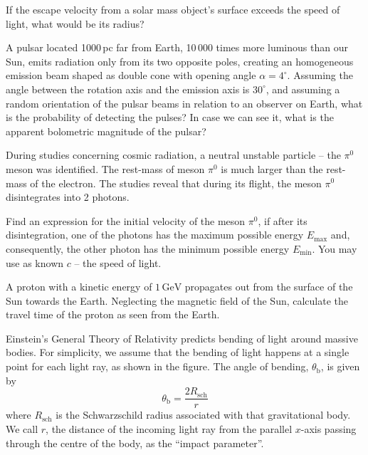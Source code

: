 If the escape velocity from a solar mass object's surface exceeds the speed of
light, what would be its radius?

A pulsar located 1000\,pc far from Earth, 10\,000 times more luminous than our
Sun, emits radiation only from its two opposite poles, creating an homogeneous
emission beam shaped as double cone with opening angle $\alpha = 4^\circ$.
Assuming the angle between the rotation axis and the emission axis is
$30^\circ$, and assuming a random orientation of the pulsar beams in relation
to an observer on Earth, what is the probability of detecting the pulses? In
case we can see it, what is the apparent bolometric magnitude of the pulsar?

During studies concerning cosmic radiation, a neutral unstable particle -- the
$\pi^0$ meson was identified. The rest-mass of meson $\pi^0$ is much larger
than the rest-mass of the electron. The studies reveal that during its flight,
the meson $\pi^0$ disintegrates into 2 photons.

Find an expression for the initial velocity of the meson $\pi^0$, if after its
disintegration, one of the photons has the maximum possible energy
$E_{\mathrm{max}}$ and, consequently, the other photon has the minimum
possible energy $E_{\mathrm{min}}$. You may use as known $c$ -- the speed of
light.

A proton with a kinetic energy of $1\,\mathrm{GeV}$ propagates out from the
surface of the Sun towards the Earth. Neglecting the magnetic field of the
Sun, calculate the travel time of the proton as seen from the Earth.

Einstein's General Theory of Relativity predicts bending of light around
massive bodies. For simplicity, we assume that the bending of light happens at
a single point for each light ray, as shown in the figure. The angle of
bending, $\theta_{\mathrm{b}}$, is given by
\[ \theta_{\mathrm{b}} = \frac{2R_{\mathrm{sch}}}{r} \]
where $R_{\mathrm{sch}}$ is the Schwarzschild radius associated with that
gravitational body. We call $r$, the distance of the incoming light ray from
the parallel $x$-axis passing through the centre of the body, as the ``impact
parameter''.

